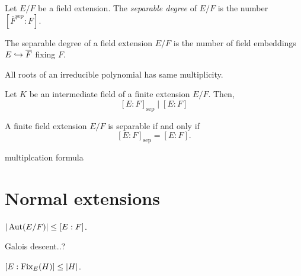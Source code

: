 \documentclass{../../large}
\newcommand{\sep}{\mathrm{sep}}
\begin{document}
\begin{prb}

Let $E/F$ be a field extension.
The \emph{separable degree} of $E/F$ is the number $[\bar F^{\sep}:F]$.

\begin{parts}
\item
The separable degree of a field extension $E/F$ is the number of field embeddings $E\hookrightarrow\overline F$ fixing $F$.
\item
All roots of an irreducible polynomial has same multiplicity.
\item
Let $K$ be an intermediate field of a finite extension $E/F$.
Then,
\[[E:F]_\sep\mid[E:F]\]
\item
A finite field extension $E/F$ is separable if and only if
\[[E:F]_\sep=[E:F].\]
\end{parts}
\end{prb}



multiplcation formula



















\section{Normal extensions}

\begin{prb}
\end{prb}

\begin{prb}

\begin{parts}
\item $|\operatorname{Aut}(E/F)|\le[E:F]$.
\end{parts}
\end{prb}

\begin{prb}
Galois descent..?
\begin{parts}
\item $[E:\operatorname{Fix}_E(H)]\le|H|$.
\end{parts}
\end{prb}
\end{document}
